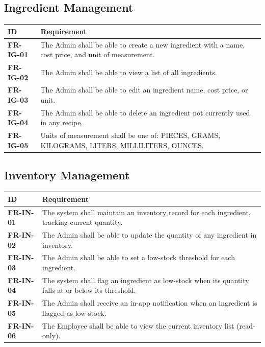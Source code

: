 \documentclass[12pt]{article}
\newcommand{\headerrow}{\rowcolor{darkblue}\color{white}\bfseries}
\begin{document}
\subsection{Ingredient Management}

\begin{longtable}{>{\bfseries}p{2cm} p{11cm}}
\toprule
\headerrow ID & Requirement \\
\midrule
\endhead
\rowcolor{lightgray} FR-IG-01 & The Admin shall be able to create a new ingredient with a name, cost price, and unit of measurement. \\
FR-IG-02 & The Admin shall be able to view a list of all ingredients. \\
\rowcolor{lightgray} FR-IG-03 & The Admin shall be able to edit an ingredient name, cost price, or unit. \\
FR-IG-04 & The Admin shall be able to delete an ingredient not currently used in any recipe. \\
\rowcolor{lightgray} FR-IG-05 & Units of measurement shall be one of: PIECES, GRAMS, KILOGRAMS, LITERS, MILLILITERS, OUNCES. \\
\bottomrule
\end{longtable}

\subsection{Inventory Management}

\begin{longtable}{>{\bfseries}p{2cm} p{11cm}}
\toprule
\headerrow ID & Requirement \\
\midrule
\endhead
\rowcolor{lightgray} FR-IN-01 & The system shall maintain an inventory record for each ingredient, tracking current quantity. \\
FR-IN-02 & The Admin shall be able to update the quantity of any ingredient in inventory. \\
\rowcolor{lightgray} FR-IN-03 & The Admin shall be able to set a low-stock threshold for each ingredient. \\
FR-IN-04 & The system shall flag an ingredient as low-stock when its quantity falls at or below its threshold. \\
\rowcolor{lightgray} FR-IN-05 & The Admin shall receive an in-app notification when an ingredient is flagged as low-stock. \\
FR-IN-06 & The Employee shall be able to view the current inventory list (read-only). \\
\bottomrule
\end{longtable}
\end{document}
